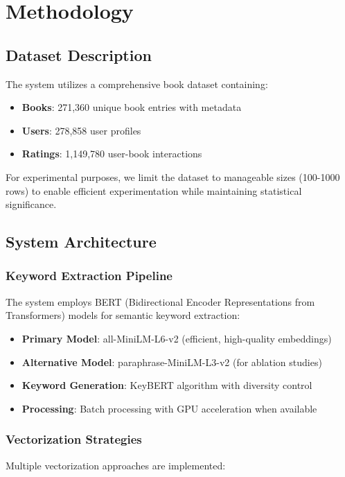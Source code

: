 \documentclass[12pt,a4paper]{article}
\begin{document}
\section{Methodology}

\subsection{Dataset Description}
The system utilizes a comprehensive book dataset containing:
\begin{itemize}
    \item \textbf{Books}: 271,360 unique book entries with metadata
    \item \textbf{Users}: 278,858 user profiles
    \item \textbf{Ratings}: 1,149,780 user-book interactions
\end{itemize}

For experimental purposes, we limit the dataset to manageable sizes (100-1000 rows) to enable efficient experimentation while maintaining statistical significance.

\subsection{System Architecture}

\subsubsection{Keyword Extraction Pipeline}
The system employs BERT (Bidirectional Encoder Representations from Transformers) models for semantic keyword extraction:

\begin{itemize}
    \item \textbf{Primary Model}: all-MiniLM-L6-v2 (efficient, high-quality embeddings)
    \item \textbf{Alternative Model}: paraphrase-MiniLM-L3-v2 (for ablation studies)
    \item \textbf{Keyword Generation}: KeyBERT algorithm with diversity control
    \item \textbf{Processing}: Batch processing with GPU acceleration when available
\end{itemize}

\subsubsection{Vectorization Strategies}
Multiple vectorization approaches are implemented:
\end{document}
